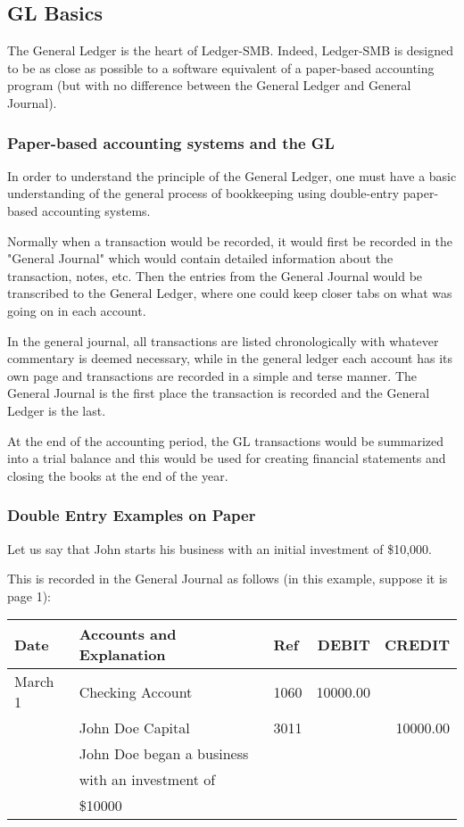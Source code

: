 \documentclass{article}
\begin{document}
\subsection{GL Basics}

The General Ledger is the heart of Ledger-SMB.  Indeed, Ledger-SMB is designed
to be as close as possible to a software equivalent of a paper-based accounting
program (but with no difference between the General Ledger and General Journal).

\subsubsection{Paper-based accounting systems and the GL}

In order to understand the principle of the General Ledger, one must have a
basic understanding of the general process of bookkeeping using double-entry
paper-based accounting systems.

Normally when a transaction would be recorded, it would first be recorded in the
"General Journal" which would contain detailed information about the
transaction, notes, etc. Then the entries from the General Journal would be
transcribed to the General Ledger, where one could keep closer tabs on what was
going on in each account.

In the general journal, all transactions are listed chronologically with
whatever commentary is deemed necessary, while in
the general ledger each account has its own page and transactions are recorded
in a simple and terse manner.  The General Journal is the first place the
transaction is recorded and the General Ledger is the last.

At the end of the accounting period, the GL transactions would be summarized
into a trial balance and this would be used for creating financial statements
and closing the books at the end of the year.

\subsubsection{Double Entry Examples on Paper}

Let us say that John starts his business with an initial investment of \$10,000.

This is recorded in the General Journal as follows (in this example, suppose it
is page 1):

\begin{tabular}{|l|l|l|r|r|}
\hline
Date & Accounts and Explanation & Ref & DEBIT & CREDIT \\
\hline
March 1 & Checking Account & 1060 & 10000.00 &  \\
 & John Doe Capital & 3011 & & 10000.00\\
 & John Doe began a business & & & \\
 & with an investment of & & & \\
 & \$10000 & & & \\
\hline
\end{tabular}\medskip
\end{document}
